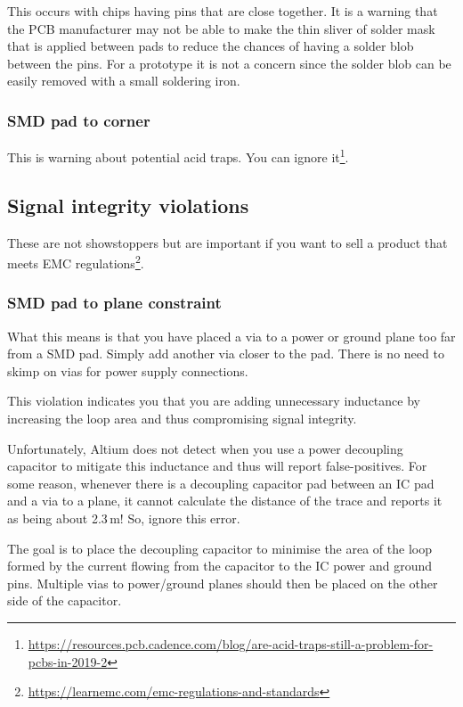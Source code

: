 This occurs with chips having pins that are close together.  It is a
warning that the PCB manufacturer may not be able to make the thin
sliver of solder mask that is applied between pads to reduce the
chances of having a solder blob between the pins.  For a prototype it
is not a concern since the solder blob can be easily removed with a
small soldering iron.


\subsubsection{SMD pad to corner}

This is warning about potential acid traps.  You can ignore
it\footnote{\url{https://resources.pcb.cadence.com/blog/are-acid-traps-still-a-problem-for-pcbs-in-2019-2}}.


\subsection{Signal integrity violations}

These are not showstoppers but are important if you want to sell a
product that meets EMC
regulations\footnote{\url{https://learnemc.com/emc-regulations-and-standards}}.


\subsubsection{SMD pad to plane constraint}

What this means is that you have placed a via to a power or ground
plane too far from a SMD pad.  Simply add another via closer to the
pad.  There is no need to skimp on vias for power supply connections.

This violation indicates you that you are adding unnecessary
inductance by increasing the loop area and thus compromising signal
integrity.

Unfortunately, Altium does not detect when you use a power decoupling
capacitor to mitigate this inductance and thus will report
false-positives.  For some reason, whenever there is a decoupling
capacitor pad between an IC pad and a via to a plane, it cannot
calculate the distance of the trace and reports it as being about
2.3\,m!  So, ignore this error.

The goal is to place the decoupling capacitor to minimise the area of
the loop formed by the current flowing from the capacitor to the IC
power and ground pins.  Multiple vias to power/ground planes should
then be placed on the other side of the capacitor.
